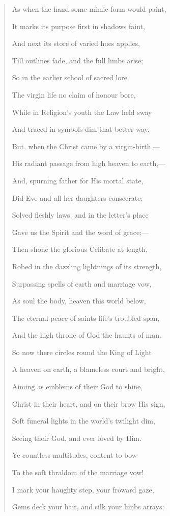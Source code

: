 \begin{quote}

As when the hand some mimic form would paint,

It marks its purpose first in shadows faint,

And next its store of varied hues applies,

Till outlines fade, and the full limbs arise;

So in the earlier school of sacred lore

The virgin life no claim of honour bore,

While in Religion's youth the Law held sway

And traced in symbols dim that better way.

But, when the Christ came by a virgin-birth,—

His radiant passage from high heaven to earth,—

And, spurning father for His mortal state,

Did Eve and all her daughters consecrate;

Solved fleshly laws, and in the letter's place

Gave us the Spirit and the word of grace;—

Then shone the glorious Celibate at length,

Robed in the dazzling lightnings of its strength,

Surpassing spells of earth and marriage vow,

As soul the body, heaven this world below,

The eternal peace of saints life's troubled span,

And the high throne of God the haunts of man.

So now there circles round the King of Light

A heaven on earth, a blameless court and bright,

Aiming as emblems of their God to shine,

Christ in their heart, and on their brow His sign,

Soft funeral lights in the world's twilight dim,

Seeing their God, and ever loved by Him.

Ye countless multitudes, content to bow

To the soft thraldom of the marriage vow!

I mark your haughty step, your froward gaze,

Gems deck your hair, and silk your limbs arrays; 


\end{quote}
